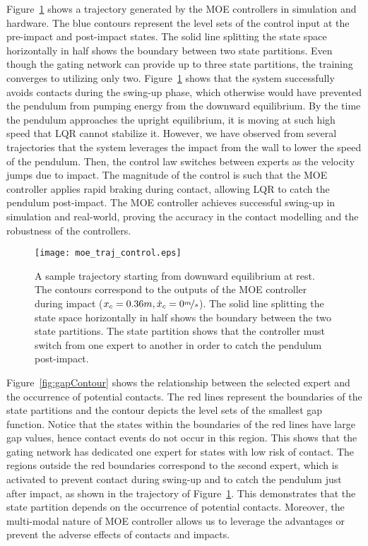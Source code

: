 Figure~\ref{fig:cartpole_trajectory} shows a trajectory generated by the MOE
controllers in simulation and hardware.
%
The blue contours represent the level sets of the control input at the
pre-impact and post-impact states.
%
The solid line splitting the state space horizontally in half shows the boundary
between two state partitions.
%
Even though the gating network can provide up to three state partitions, the
training converges to utilizing only two.
%
Figure~\ref{fig:cartpole_trajectory} shows that the system successfully avoids
contacts during the swing-up phase, which otherwise would have prevented the
pendulum from pumping energy from the downward equilibrium.
%
By the time the pendulum approaches the upright equilibrium, it is moving at
such high speed that LQR cannot stabilize it.
%
However, we have observed from several trajectories that the system leverages
the impact from the wall to lower the speed of the pendulum.
%
Then, the control law switches between experts as the velocity jumps due to impact.
%
The magnitude of the control is such that the MOE controller applies rapid
braking during contact, allowing LQR to catch the pendulum post-impact.
%
The MOE controller achieves successful swing-up in simulation and real-world,
proving the accuracy in the contact modelling and the robustness of the
controllers.


\begin{figure}[H]
    \centering
    \texttt{[image: moe\_traj\_control.eps]}
    \caption{A sample trajectory starting from downward equilibrium at rest.
    The contours correspond to the outputs of the MOE controller during impact
    ($x_c=0.36m, \dot{x}_c = 0\nicefrac{m}{s}$). The solid line
    splitting the state space horizontally in half shows the boundary between
    the two state partitions. The state partition shows that the controller must
    switch from one expert to another in order to catch the pendulum
    post-impact.}
    \label{fig:cartpole_trajectory}
\end{figure}

Figure~\ref{fig:gapContour} shows the relationship between the selected expert
and the occurrence of potential contacts.
%
The red lines represent the boundaries of the state partitions and the contour
depicts the level sets of the smallest gap function.
%
Notice that the states within the boundaries of the red lines have large gap
values, hence contact events do not occur in this region.
%
This shows that the gating network has dedicated one expert for states with low
risk of contact.
%
The regions outside the red boundaries correspond to the second expert, which is
activated to prevent contact during swing-up and to catch the pendulum just
after impact, as shown in the trajectory of
Figure~\ref{fig:cartpole_trajectory}.
%
This demonstrates that the state partition depends on the occurrence of
potential contacts.
%
Moreover, the multi-modal nature of MOE controller allows us to leverage the
advantages or prevent the adverse effects of contacts and impacts.~

